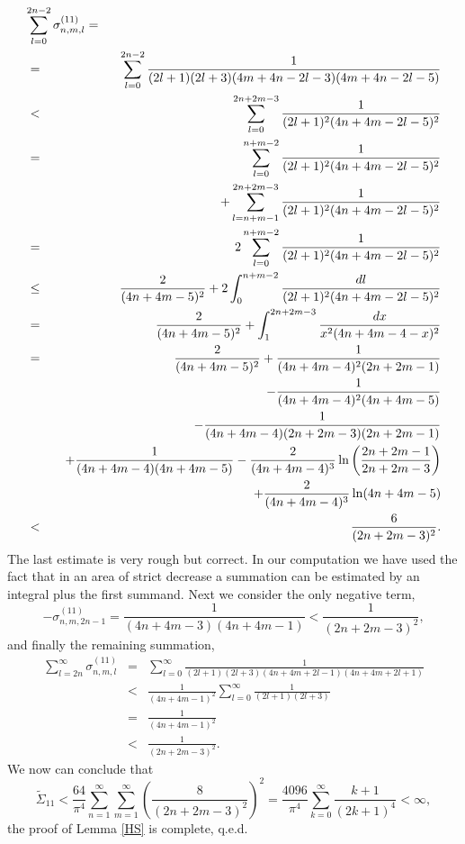 \documentclass[10pt,a4paper]{article}
\begin{document}
\begin{appendix}
\begin{eqnarray*}
\lefteqn{\sum_{l=0}^{2n-2} \sigma_{n,m,l}^{(11)}=}\\
&=& \sum_{l=0}^{2n-2}
\frac{1}{(2l+1)(2l+3)(4m+4n-2l-3)(4m+4n-2l-5)} \\
&<& \sum_{l=0}^{2n+2m-3}
\frac{1}{(2l+1)^2(4n+4m-2l-5)^2} \\
&=& \sum_{l=0}^{n+m-2}\frac{1}{(2l+1)^2(4n+4m-2l-5)^2}
\\ && \qquad + \sum_{l=n+m-1}^{2n+2m-3}
\frac{1}{(2l+1)^2(4n+4m-2l-5)^2} \\
&=& 2\sum_{l=0}^{n+m-2}\frac{1}{(2l+1)^2(4n+4m-2l-5)^2}\\
&\le& \frac{2}{(4n+4m-5)^2} + 2 \int_0^{n+m-2}
\frac{dl}{(2l+1)^2(4n+4m-2l-5)^2} \\
&=& \frac{2}{(4n+4m-5)^2} +  \int_1^{2n+2m-3}
\frac{dx}{x^2(4n+4m-4-x)^2} \\
&=& \frac{2}{(4n+4m-5)^2} + \frac{1}{(4n+4m-4)^2(2n+2m-1)}
\\ && \quad -\frac{1}{(4n+4m-4)^2(4n+4m-5)}  \\
&& \quad
-\frac{1}{(4n+4m-4)(2n+2m-3)(2n+2m-1)} \\
&& \quad
+\frac{1}{(4n+4m-4)(4n+4m-5)}
-\frac{2}{(4n+4m-4)^3}
\ln\left(\frac{2n+2m-1}{2n+2m-3}\right)
\\ && \qquad
+\frac{2}{(4n+4m-4)^3} \ln ( 4n+4m-5) \\
&<& \frac{6}{(2n+2m-3)^2}.
\end{eqnarray*}
The last estimate is very rough but correct. In our computation
we have used the fact that in an area of strict decrease a
summation can be estimated by an integral plus the first
summand. Next we consider the only negative term,
\[ -\sigma_{n,m,2n-1}^{(11)} = \frac{1}{(4n+4m-3)(4n+4m-1)}
< \frac{1}{(2n+2m-3)^2}, \]
and finally the remaining summation,
\begin{eqnarray*}
\sum_{l=2n}^\infty \sigma_{n,m,l}^{(11)}
&=&\sum_{l=0}^\infty
\frac{1}{(2l+1)(2l+3)(4n+4m+2l-1)(4n+4m+2l+1)} \\
&<& \frac{1}{(4n+4m-1)^2} \sum_{l=0}^\infty
\frac{1}{(2l+1)(2l+3)} \\
&=& \frac{1}{(4n+4m-1)^2} \\
&<& \frac{1}{(2n+2m-3)^2}.
\end{eqnarray*}
We now can conclude that
\[ \tilde{\Sigma}_{11} < \frac{64}{\pi^4} \sum_{n=1}^\infty
\sum_{m=1}^\infty \left( \frac{8}{(2n+2m-3)^2} \right)^2
= \frac{4096}{\pi^4} \sum_{k=0}^\infty
\frac{k+1}{(2k+1)^4} < \infty, \]
the proof of Lemma \ref{HS} is complete, q.e.d.
\end{appendix}
\end{document}
